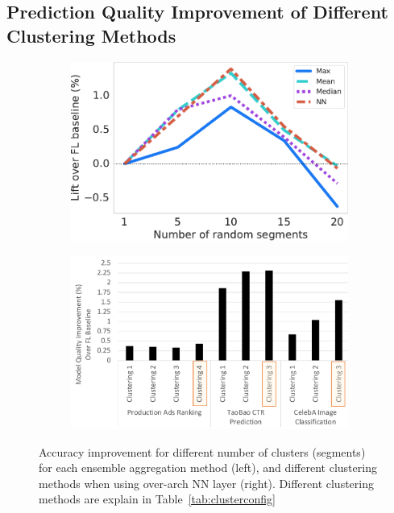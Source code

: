 \documentclass{article}
\begin{document}
\subsection{Prediction Quality Improvement of Different Clustering Methods}
\vspace{-0.25cm}
\label{sec:prediction-quality-clustering}

\begin{figure}
\centering
    \begin{subfigure}[b]{0.45\textwidth}
        \centering
        \includegraphics[width=\textwidth]{random_vs_partitions (1).pdf}
        \label{fig:eval0_0}
     \end{subfigure}
     \begin{subfigure}[b]{0.49\textwidth}
        \centering
        \includegraphics[width=\textwidth]{FEL.pdf}
        \label{fig:eval0_1}
     \end{subfigure}
     \vspace{-0.3cm}
     \caption{Accuracy improvement for different number of clusters (segments) for each ensemble aggregation method (left), and different clustering methods when using over-arch NN layer (right). Different clustering methods are explain in Table~\ref{tab:clusterconfig}}
    \label{fig:eval0}
\vspace{-0.25cm}
\end{figure}
\end{document}
